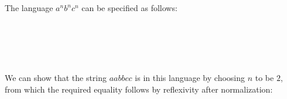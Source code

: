 \begin{example}\label{ex:non-context-free}
The language $a^n b^n c^n$ can be specified as follows:
\begin{code}[hide]%
\>[0]\AgdaSpace{}%
\AgdaSymbol{:}\AgdaSpace{}%
\AgdaSpace{}%
\AgdaSpace{}%
\AgdaSpace{}%
\AgdaSpace{}%
\<%
\\
\>[0]\AgdaSpace{}%
\AgdaSpace{}%
\AgdaSymbol{\AgdaUnderscore{}}\AgdaSpace{}%
\AgdaSymbol{=}\AgdaSpace{}%
\AgdaInductiveConstructor{[]}\<%
\\
\>[0]\AgdaSpace{}%
\AgdaSymbol{(}\AgdaSpace{}%
\AgdaSymbol{)}\AgdaSpace{}%
\AgdaSpace{}%
\AgdaSymbol{=}\AgdaSpace{}%
\AgdaSpace{}%
\AgdaSpace{}%
\AgdaSpace{}%
\AgdaSpace{}%
\<%
\end{code}
\begin{code}%
\>[0]\AgdaSpace{}%
\AgdaSymbol{:}\AgdaSpace{}%
\<%
\\
\>[0]\AgdaSpace{}%
\AgdaSpace{}%
\AgdaSymbol{=}\AgdaSpace{}%
\AgdaFunction{Σ[}\AgdaSpace{}%
\AgdaSpace{}%
\AgdaSpace{}%
\AgdaSpace{}%
\AgdaFunction{]}\AgdaSpace{}%
\AgdaSpace{}%
\AgdaSpace{}%
\AgdaSpace{}%
\AgdaSpace{}%
\AgdaSpace{}%
\AgdaOperator{\AgdaFunction{++}}\AgdaSpace{}%
\AgdaSpace{}%
\AgdaSpace{}%
\AgdaSpace{}%
\AgdaOperator{\AgdaFunction{++}}\AgdaSpace{}%
\AgdaSpace{}%
\AgdaSpace{}%
\<%
\end{code}
We can show that the string $aabbcc$ is in this language by choosing $n$ to be $2$, from which the required equality follows by reflexivity after normalization:
\begin{code}%
\>[0]\AgdaSpace{}%
\AgdaSymbol{:}\AgdaSpace{}%
\AgdaSpace{}%
\<%
\\
\>[0]\AgdaSpace{}%
\AgdaSymbol{=}\AgdaSpace{}%
\AgdaSpace{}%
\AgdaOperator{\AgdaInductiveConstructor{,}}\AgdaSpace{}%
\<%
\end{code}
\end{example}
